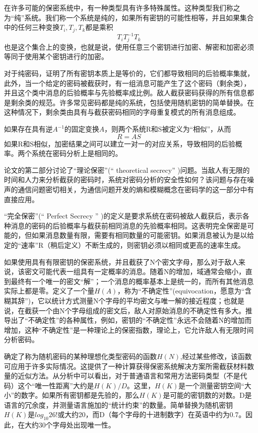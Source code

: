 \documentclass[]{article}
\begin{document}
在许多可能的保密系统中，有一种类型具有许多特殊属性。这种类型我们称之为“纯”系统。我们称一个系统是纯的，如果所有密钥的可能性相等，并且如果集合中的任何三种变换$T_i,T_j,T_k$都是乘积	
\[T_iT^{-1}_jT_k\]
也是这个集合上的变换，也就是说，使用任意三个密钥进行加密、解密和加密必须等同于使用某个密钥进行的加密。
	
对于纯密码，证明了所有密钥本质上是等价的，它们都导致相同的后验概率集就，此外，当一个给定的密码被截获时，有一组消息可能产生了这个密码（剩余类），并且这个类中消息的后验概率与先验概率成比例。敌人截获密码获得的所有信息都是剩余类的规范。许多常见密码都是纯的系统，包括使用随机密钥的简单替换。在这种情况下，剩余类由具有与截获密码相同的字母重复模式的所有消息组成。

如果存在具有逆$A^{-1}$的固定变换$A$，则两个系统R和S被定义为“相似”，从而
\[R=AS\]
如果R和S相似，加密结果之间可以建立一对一的对应关系，导致相同的后验概率。两个系统在密码分析上是相同的。


论文的第二部分讨论了“理论保密”(“ theoretical secrecy” )问题。当敌人有无限的时间和人力来分析截获的密码时，系统对密码分析的安全性如何？该问题与存在噪声的通信问题密切相关，为通信问题开发的熵和模糊概念在密码学的这一部分中有直接应用。


“完全保密”(“ Perfect Secrecy ” )的定义是要求系统在密码被敌人截获后，表示各种消息的密码的后验概率与截获前相同消息的先验概率相同。这表明完全保密是可能的，但如果消息数量有限，需要有相同数量的可能密钥。如果消息被认为是以给定的“速率”R（稍后定义）不断生成的，则密钥必须以相同或更高的速率生成。


如果使用具有有限密钥的保密系统，并且截获了N个密文字母，那么对于敌人来说，该密文可能代表一组具有一定概率的消息。随着N的增加，域通常会缩小，直到最终有一个唯一的密文“解”；一个消息的概率基本上是统一的，而所有其他消息实际上都是零。定义了一个量$H(A)$，称为“不确定性”(equivocation，愿意为“含糊其辞”)，它以统计方式测量N个字母的平均密文与唯一解的接近程度；也就是说，在截获一个由N个字母组成的密文后，敌人对原始消息的不确定性有多大。推导出了“不确定性”的各种属性，例如，密钥的“不确定性”永远不会随着N的增加而增加，这种“不确定性”是一种理论上的保密指数，理论上，它允许敌人有无限时间分析密码。


确定了称为随机密码的某种理想化类型密码的函数$H(N)$,经过某些修改，该函数可应用于许多实际情况。这提供了一种计算获得保密系统解决方案所需截获材料数量的近似方法。从分析中可以看出，对于普通语言和常用方法密码类型（不是代码）这个“唯一性距离”大约是$H(K)/D$。这里，$H(K)$是一个测量密钥空间“大小”的数字。如果所有密钥都是先验的，那么$H(K)$是可能的密钥数的对数。D是语言的冗余度，并测量语言施加的“统计约束”的数量。简单替换为随机密钥$H(K)$是$log_{10}26!$或大约20，而D（每个字母的十进制数字）在英语中约为0.7。因此，在大约30个字母处出现唯一性。
\end{document}
